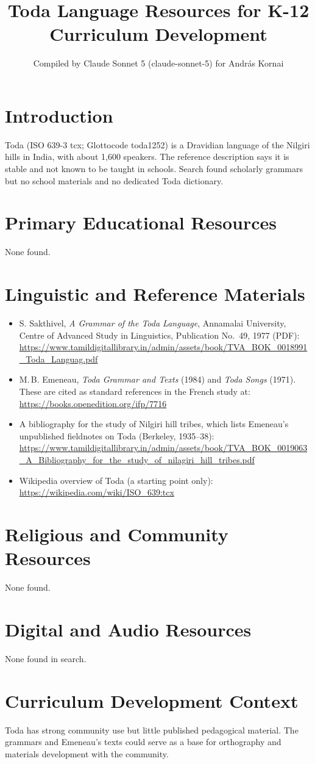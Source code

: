 \documentclass[12pt]{article}
\title{Toda Language Resources for K-12 Curriculum Development}
\author{Compiled by Claude Sonnet 5 (claude-sonnet-5) for Andr\'as Kornai}
\date{}
\begin{document}
\maketitle

\section{Introduction}
Toda (ISO 639-3 tcx; Glottocode toda1252) is a Dravidian language of the Nilgiri hills in India, with about 1,600 speakers. The reference description says it is stable and not known to be taught in schools. Search found scholarly grammars but no school materials and no dedicated Toda dictionary.

\section{Primary Educational Resources}
None found.

\section{Linguistic and Reference Materials}
\begin{itemize}
\item S. Sakthivel, \emph{A Grammar of the Toda Language}, Annamalai University, Centre of Advanced Study in Linguistics, Publication No.~49, 1977 (PDF): \url{https://www.tamildigitallibrary.in/admin/assets/book/TVA_BOK_0018991_Toda_Languag.pdf}
\item M.\,B. Emeneau, \emph{Toda Grammar and Texts} (1984) and \emph{Toda Songs} (1971). These are cited as standard references in the French study at: \url{https://books.openedition.org/ifp/7716}
\item A bibliography for the study of Nilgiri hill tribes, which lists Emeneau's unpublished fieldnotes on Toda (Berkeley, 1935--38): \url{https://www.tamildigitallibrary.in/admin/assets/book/TVA_BOK_0019063_A_Bibliography_for_the_study_of_nilagiri_hill_tribes.pdf}
\item Wikipedia overview of Toda (a starting point only): \url{https://wikipedia.com/wiki/ISO_639:tcx}
\end{itemize}

\section{Religious and Community Resources}
None found.

\section{Digital and Audio Resources}
None found in search.

\section{Curriculum Development Context}
Toda has strong community use but little published pedagogical material. The grammars and Emeneau's texts could serve as a base for orthography and materials development with the community.
\end{document}
